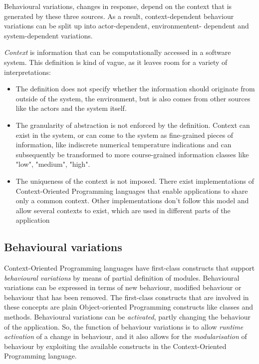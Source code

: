 \documentclass{acm_proc_article-sp}
\begin{document}
Behavioural variations, changes in response, depend on the context that is generated by these three sources. As a result, context-dependent behaviour variations can be split up into actor-dependent, environmentent- dependent and system-dependent variations.

\textit{Context} is information that can be computationally accessed in a software system. This definition is kind of vague, as it leaves room for a variety of interpretations: 
\begin{itemize}
\item The definition does not specify whether the information should originate from outside of the system, the environment, but is also comes from other sources like the actors and the system itself.
\item The granularity of abstraction is not enforced by the definition. Context can exist in the system, or can come to the system as fine-grained pieces of information, like indiscrete numerical temperature indications and can subsequently be transformed to more course-grained information classes like "low", "medium", "high". 
\item The uniqueness of the context is not imposed. There exist implementations of Context-Oriented Programming languages that enable applications to share only a common context. Other implementations don't follow this model and allow several contexts to exist, which are used in different parts of the application \cite{Appeltauer:2009:CCP:1562112.1562118}
\end{itemize}

\subsection{Behavioural variations}
Context-Oriented Programming languages have first-class constructs that support \textit{behavioural variations} by means of partial definition of modules. Behavioural variations can be expressed in terms of new behaviour, modified behaviour or behaviour that has been removed. The first-class constructs that are involved in these concepts are plain Object-oriented Programming constructs like classes and methods. Behavioural variations can be \textit{activated}, partly changing the behaviour of the application. So, the function of behaviour variations is to allow \textit{runtime activation} of a change in behaviour, and it also allows for the \textit{modularisation} of behaviour by exploiting the available constructs in the Context-Oriented Programming language.    
\end{document}
